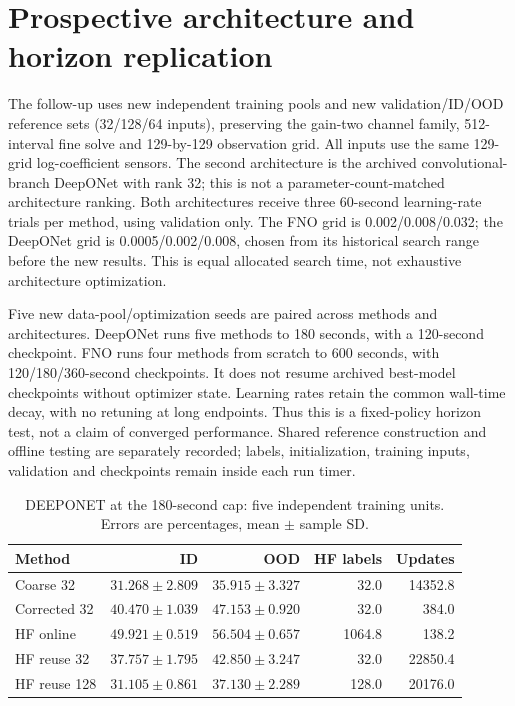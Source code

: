 \section{Prospective architecture and horizon replication}

The follow-up uses new independent training pools and new validation/ID/OOD reference sets (32/128/64 inputs), preserving the gain-two channel family, 512-interval fine solve and 129-by-129 observation grid. All inputs use the same 129-grid log-coefficient sensors. The second architecture is the archived convolutional-branch DeepONet with rank 32; this is not a parameter-count-matched architecture ranking. Both architectures receive three 60-second learning-rate trials per method, using validation only. The FNO grid is 0.002/0.008/0.032; the DeepONet grid is 0.0005/0.002/0.008, chosen from its historical search range before the new results. This is equal allocated search time, not exhaustive architecture optimization.

Five new data-pool/optimization seeds are paired across methods and architectures. DeepONet runs five methods to 180 seconds, with a 120-second checkpoint. FNO runs four methods from scratch to 600 seconds, with 120/180/360-second checkpoints. It does not resume archived best-model checkpoints without optimizer state. Learning rates retain the common wall-time decay, with no retuning at long endpoints. Thus this is a fixed-policy horizon test, not a claim of converged performance. Shared reference construction and offline testing are separately recorded; labels, initialization, training inputs, validation and checkpoints remain inside each run timer.

\begin{table}[ht]\centering\small

\caption{DEEPONET at the 180-second cap: five independent training units. Errors are percentages, mean $\pm$ sample SD.}

\begin{tabular}{lrrrr}\toprule Method & ID & OOD & HF labels & Updates\\\midrule

Coarse 32 & $31.268\pm2.809$ & $35.915\pm3.327$ & 32.0 & 14352.8\\

Corrected 32 & $40.470\pm1.039$ & $47.153\pm0.920$ & 32.0 & 384.0\\

HF online & $49.921\pm0.519$ & $56.504\pm0.657$ & 1064.8 & 138.2\\

HF reuse 32 & $37.757\pm1.795$ & $42.850\pm3.247$ & 32.0 & 22850.4\\

HF reuse 128 & $31.105\pm0.861$ & $37.130\pm2.289$ & 128.0 & 20176.0\\

\bottomrule\end{tabular}\end{table}

